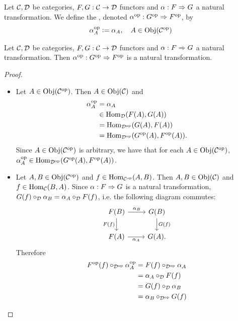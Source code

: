 \documentclass{book}
\begin{document}
	\begin{defn} 
		Let $\mathcal{C}, \mathcal{D}$ be categories, $F,G:\mathcal{C} \rightarrow \mathcal{D}$ functors and $\alpha:F \Rightarrow G$ a natural transformation. We define the , denoted ${\alpha}^{\text{op}}: {G}^{\text{op}} \Rightarrow {F}^{\text{op}}$, by 
		$${\alpha}^{\text{op}}_A \vcentcolon= \alpha_A, \quad A \in \operatorname{Obj}({\mathcal{C}}^{\text{op}})$$
	\end{defn}
	
	\begin{ex} 
		Let $\mathcal{C}, \mathcal{D}$ be categories, $F,G:\mathcal{C} \rightarrow \mathcal{D}$ functors and $\alpha:F \Rightarrow G$ a natural transformation. Then ${\alpha}^{\text{op}}: {G}^{\text{op}} \Rightarrow {F}^{\text{op}}$ is a natural transformation.
	\end{ex}
	
	\begin{proof}\
		\begin{itemize}
			\item Let $A \in \operatorname{Obj}({\mathcal{C}}^{\text{op}})$. Then $A \in \operatorname{Obj}(\mathcal{C})$ and
			\begin{align*}
				{\alpha}^{\text{op}}_A
				& = \alpha_A \\
				& \in \operatorname{Hom}_{\mathcal{D}}(F(A), G(A)) \\
				& = \operatorname{Hom}_{{\mathcal{D}}^{\text{op}}}(G(A), F(A)) \\
				& = \operatorname{Hom}_{{\mathcal{D}}^{\text{op}}}({G}^{\text{op}}(A), {F}^{\text{op}}(A)).
			\end{align*}
			Since $A \in \operatorname{Obj}({\mathcal{C}}^{\text{op}})$ is arbitrary, we have that for each $A \in \operatorname{Obj}({\mathcal{C}}^{\text{op}})$, ${\alpha}^{\text{op}}_A \in \operatorname{Hom}_{{\mathcal{D}}^{\text{op}}}({G}^{\text{op}}(A), {F}^{\text{op}}(A))$.
			\item Let $A, B \in \operatorname{Obj}({\mathcal{C}}^{\text{op}})$ and $f \in \operatorname{Hom}_{{\mathcal{C}}^{\text{op}}}(A, B)$. Then $A, B \in \operatorname{Obj}(\mathcal{C})$ and $f \in \operatorname{Hom}_{\mathcal{C}}(B, A)$. Since $\alpha:F \Rightarrow G$ is a natural transformation, $G(f) \circ_{\mathcal{D}} \alpha_B = \alpha_A \circ_{\mathcal{D}} F(f)$, i.e. the following diagram commutes:
			\[ 
			\begin{tikzcd}
				F(B)  \arrow[r, "\al_B"]  \arrow[d, "F(f)"']  & G(B)   \arrow[d, "G(f)"]\\
				F(A) \arrow[r, "\al_A"'] &  G(A).
			\end{tikzcd}
			\]
			Therefore
			\begin{align*}
				\op{F}(f) \circ_{\op{\MD}} \op{\al}_A
				& = F(f) \circ_{\op{\MD}} \al_A \\
				& = \al_A \circ_{\MD} F(f) \\
				& = G(f) \circ_{\MD} \al_B \\
				& = \al_B \circ_{\op{\MD}} G(f) \\

\end{align*}
\end{itemize}
\end{proof}
\end{document}
